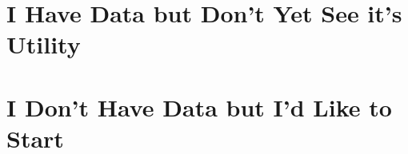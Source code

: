 \chapter{I Have Data but Don't Yet See it's Utility}


\chapter{I Don't Have Data but I'd Like to Start}